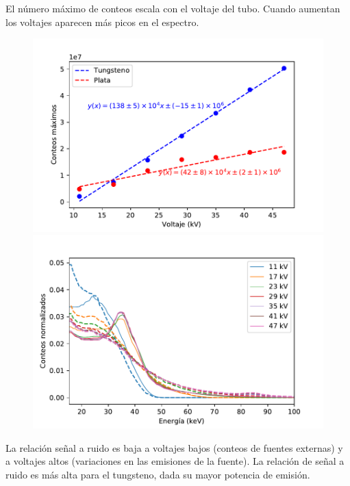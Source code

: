 \documentclass{sciposter}
\begin{document}
\begin{multicols}{3}
	El número máximo de conteos escala con el voltaje del tubo. Cuando aumentan los voltajes aparecen más picos en el espectro.
	
	\begin{figure}[h]
		\centering
		\includegraphics[width = 0.9\linewidth]{Figuras/Max_voltage.pdf}
		
		\includegraphics[width = 0.9\linewidth]{Figuras/Both_Normed.pdf}
%				
%				
	\end{figure}
	
	La relación señal a ruido es baja a voltajes bajos (conteos de fuentes externas) y a voltajes altos (variaciones en las emisiones de la fuente).
	La relación de señal a ruido es más alta para el tungsteno, dada su mayor potencia de emisión.
	

\end{multicols}
\end{document}
